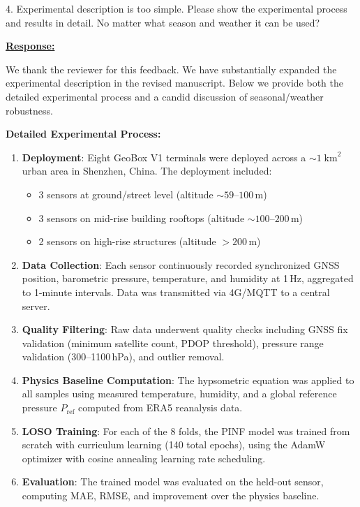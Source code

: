 \newpage

\begin{cmtthree}{}{}
4. Experimental description is too simple. Please show the experimental process and results in detail. No matter what season and weather it can be used?

\end{cmtthree}
\vspace{0.1cm}
\noindent
\underline{\textbf{Response:}}
\vspace{0.2cm}

We thank the reviewer for this feedback. We have substantially expanded the experimental description in the revised manuscript. Below we provide both the detailed experimental process and a candid discussion of seasonal/weather robustness.

\textbf{Detailed Experimental Process:}
\begin{enumerate}
    \item \textbf{Deployment}: Eight GeoBox V1 terminals were deployed across a ${\sim}1\;\text{km}^2$ urban area in Shenzhen, China. The deployment included:
    \begin{itemize}
        \item 3 sensors at ground/street level (altitude ${\sim}59$--$100$\,m)
        \item 3 sensors on mid-rise building rooftops (altitude ${\sim}100$--$200$\,m)
        \item 2 sensors on high-rise structures (altitude $>200$\,m)
    \end{itemize}
    \item \textbf{Data Collection}: Each sensor continuously recorded synchronized GNSS position, barometric pressure, temperature, and humidity at 1\,Hz, aggregated to 1-minute intervals. Data was transmitted via 4G/MQTT to a central server.
    \item \textbf{Quality Filtering}: Raw data underwent quality checks including GNSS fix validation (minimum satellite count, PDOP threshold), pressure range validation (300--1100\,hPa), and outlier removal.
    \item \textbf{Physics Baseline Computation}: The hypsometric equation was applied to all samples using measured temperature, humidity, and a global reference pressure $P_{\text{ref}}$ computed from ERA5 reanalysis data.
    \item \textbf{LOSO Training}: For each of the 8 folds, the PINF model was trained from scratch with curriculum learning (140 total epochs), using the AdamW optimizer with cosine annealing learning rate scheduling.
    \item \textbf{Evaluation}: The trained model was evaluated on the held-out sensor, computing MAE, RMSE, and improvement over the physics baseline.
\end{enumerate}

